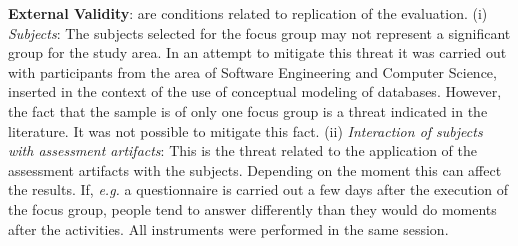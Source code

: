 \documentclass[a4paper,twoside,anonymous]{article}
\begin{document}

\textbf{External Validity}: are conditions related to replication of the evaluation.
(i) \textit{Subjects}: The subjects selected for the focus group may not represent a significant group for the study area. In an attempt to mitigate this threat it was carried out with participants from the area of Software Engineering and Computer Science, inserted in the context of the use of conceptual modeling of databases. 
However, the fact that the sample is of only one focus group is a threat indicated in the literature. It was not possible to mitigate this fact.
(ii) \textit{Interaction of subjects with assessment artifacts}: This is the threat related to the application of the assessment artifacts 
with the subjects. Depending on the moment this can affect the results. If, \textit{e.g.} a questionnaire is carried out a few days after the execution of the focus group, people tend to answer differently than they would do moments after the activities. All instruments were performed in the same session.

\end{document}
